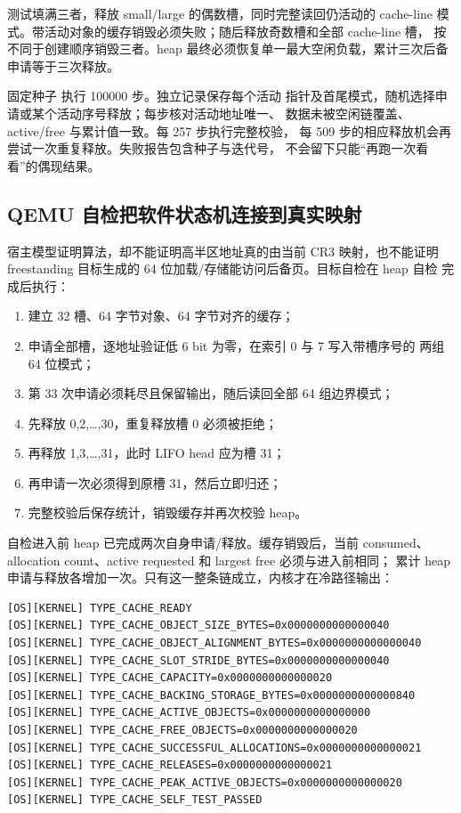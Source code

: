 测试填满三者，释放 small/large 的偶数槽，同时完整读回仍活动的 cache-line
模式。带活动对象的缓存销毁必须失败；随后释放奇数槽和全部 cache-line 槽，
按不同于创建顺序销毁三者。heap 最终必须恢复单一最大空闲负载，累计三次后备
申请等于三次释放。

固定种子  执行 100000 步。独立记录保存每个活动
指针及首尾模式，随机选择申请或某个活动序号释放；每步核对活动地址唯一、
数据未被空闲链覆盖、active/free 与累计值一致。每 257 步执行完整校验，
每 509 步的相应释放机会再尝试一次重复释放。失败报告包含种子与迭代号，
不会留下只能“再跑一次看看”的偶现结果。

\subsection{QEMU 自检把软件状态机连接到真实映射}

宿主模型证明算法，却不能证明高半区地址真的由当前 CR3 映射，也不能证明
freestanding 目标生成的 64 位加载/存储能访问后备页。目标自检在 heap 自检
完成后执行：

\begin{enumerate}[label=\arabic*.]
  \item 建立 32 槽、64 字节对象、64 字节对齐的缓存；
  \item 申请全部槽，逐地址验证低 6 bit 为零，在索引 0 与 7 写入带槽序号的
        两组 64 位模式；
  \item 第 33 次申请必须耗尽且保留输出，随后读回全部 64 组边界模式；
  \item 先释放 0,2,\ldots,30，重复释放槽 0 必须被拒绝；
  \item 再释放 1,3,\ldots,31，此时 LIFO head 应为槽 31；
  \item 再申请一次必须得到原槽 31，然后立即归还；
  \item 完整校验后保存统计，销毁缓存并再次校验 heap。
\end{enumerate}

自检进入前 heap 已完成两次自身申请/释放。缓存销毁后，当前 consumed、
allocation count、active requested 和 largest free 必须与进入前相同；
累计 heap 申请与释放各增加一次。只有这一整条链成立，内核才在冷路径输出：

\begin{verbatim}
[OS][KERNEL] TYPE_CACHE_READY
[OS][KERNEL] TYPE_CACHE_OBJECT_SIZE_BYTES=0x0000000000000040
[OS][KERNEL] TYPE_CACHE_OBJECT_ALIGNMENT_BYTES=0x0000000000000040
[OS][KERNEL] TYPE_CACHE_SLOT_STRIDE_BYTES=0x0000000000000040
[OS][KERNEL] TYPE_CACHE_CAPACITY=0x0000000000000020
[OS][KERNEL] TYPE_CACHE_BACKING_STORAGE_BYTES=0x0000000000000840
[OS][KERNEL] TYPE_CACHE_ACTIVE_OBJECTS=0x0000000000000000
[OS][KERNEL] TYPE_CACHE_FREE_OBJECTS=0x0000000000000020
[OS][KERNEL] TYPE_CACHE_SUCCESSFUL_ALLOCATIONS=0x0000000000000021
[OS][KERNEL] TYPE_CACHE_RELEASES=0x0000000000000021
[OS][KERNEL] TYPE_CACHE_PEAK_ACTIVE_OBJECTS=0x0000000000000020
[OS][KERNEL] TYPE_CACHE_SELF_TEST_PASSED
\end{verbatim}

